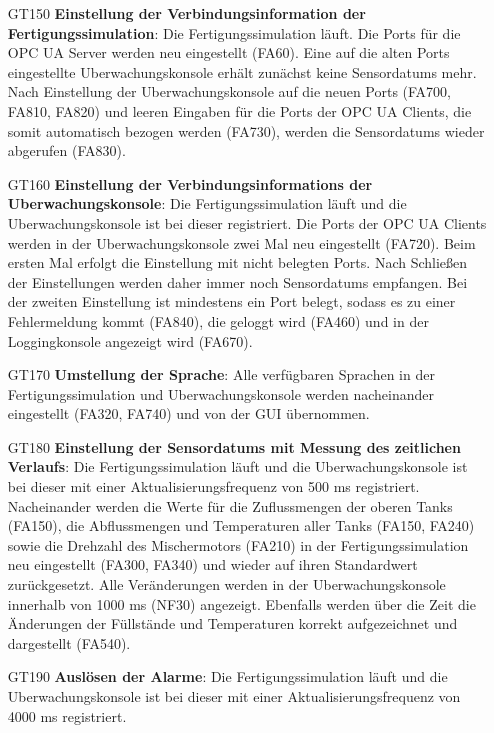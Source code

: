 \documentclass[parskip=full]{scrartcl}
\begin{document}
\begin{enumerate}
  \item[GT150] \textbf{Einstellung der \gls{Verbindungsinformation} der \gls{Fertigungssimulation}}: Die \gls{Fertigungssimulation} läuft. Die Ports für die \gls{OPC UA Server} werden neu eingestellt (FA60). Eine auf die
   alten Ports eingestellte \gls{Uberwachungskonsole} erhält zunächst keine \glspl{Sensordatum} mehr. Nach Einstellung der \gls{Uberwachungskonsole} auf die neuen Ports (FA700, FA810, FA820) und leeren Eingaben für die Ports der \glspl{OPC UA Client}, die somit automatisch bezogen werden (FA730), werden die \glspl{Sensordatum} wieder abgerufen (FA830).
  \item[GT160] \textbf{Einstellung der \glspl{Verbindungsinformation} der \gls{Uberwachungskonsole}}: Die \gls{Fertigungssimulation} läuft und die \gls{Uberwachungskonsole} ist bei dieser registriert. Die Ports der
   \glspl{OPC UA Client} werden in der \gls{Uberwachungskonsole} zwei Mal neu eingestellt (FA720). Beim ersten Mal erfolgt die Einstellung mit nicht belegten Ports. Nach Schließen der Einstellungen werden daher immer noch \glspl{Sensordatum} empfangen. Bei der zweiten Einstellung ist mindestens ein Port belegt, sodass es zu einer Fehlermeldung kommt (FA840), die geloggt wird (FA460) und in der Loggingkonsole angezeigt wird (FA670).
  \item[GT170] \textbf{Umstellung der Sprache}: Alle verfügbaren Sprachen in der \gls{Fertigungssimulation} und \gls{Uberwachungskonsole} werden nacheinander eingestellt (FA320, FA740) und von der \gls{GUI} übernommen.
  \item[GT180] \textbf{Einstellung der \glspl{Sensordatum} mit Messung des zeitlichen Verlaufs}: Die \gls{Fertigungssimulation} läuft und die \gls{Uberwachungskonsole} ist bei dieser mit einer
   Aktualisierungsfrequenz von 500 ms registriert. Nacheinander werden die Werte für die Zuflussmengen der oberen Tanks (FA150), die Abflussmengen und
   Temperaturen aller Tanks (FA150, FA240) sowie die Drehzahl des Mischermotors (FA210) in der \gls{Fertigungssimulation} neu eingestellt (FA300, FA340) und wieder auf ihren Standardwert zurückgesetzt.
   Alle Veränderungen werden in der \gls{Uberwachungskonsole} innerhalb von 1000 ms (NF30) angezeigt. Ebenfalls werden über die Zeit die Änderungen der Füllstände und
   Temperaturen korrekt aufgezeichnet und dargestellt (FA540).
  \item[GT190] \textbf{Auslösen der Alarme}: Die \gls{Fertigungssimulation} läuft und die \gls{Uberwachungskonsole} ist bei dieser mit einer Aktualisierungsfrequenz von 4000 ms registriert.

\end{enumerate}
\end{document}
